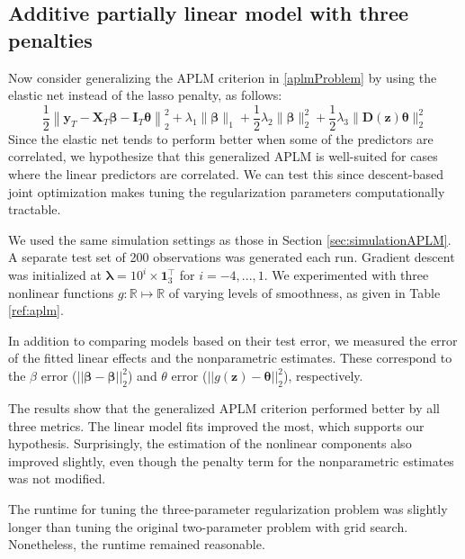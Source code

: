 \documentclass[12pt,letterpaper]{article}
\begin{document}
\subsection{Additive partially linear model with three penalties}
Now consider generalizing the APLM criterion in \eqref{aplmProblem} by using the elastic net instead of the lasso penalty, as follows:
\begin{equation}
\frac{1}{2} \left \|
\boldsymbol{y}_T
- \boldsymbol{X}_T\boldsymbol{\beta}
- \boldsymbol{I}_T \boldsymbol{\theta} \right \|^2_2
+ \lambda_1 \| \boldsymbol \beta \|_1
+ \frac{1}{2} \lambda_2 \| \boldsymbol \beta \|_2^2
+ \frac{1}{2} \lambda_3 \| \boldsymbol D(\boldsymbol z) \boldsymbol \theta \|_2^2
\end{equation}
Since the elastic net tends to perform better when some of the predictors are correlated, we hypothesize that this generalized APLM is well-suited for cases where the linear predictors are correlated. We can test this since descent-based joint optimization makes tuning the regularization parameters computationally tractable.

We used the same simulation settings as those in Section \ref{sec:simulationAPLM}. A separate test set of 200 observations was generated each run. Gradient descent was initialized at $\boldsymbol{\lambda} = 10^i \times \boldsymbol 1_3^\top$ for $i=-4, ..., 1$. We experimented with three nonlinear functions $g:\mathbb{R} \mapsto \mathbb{R}$ of varying levels of smoothness, as given in Table \ref{ref:aplm}.

In addition to comparing models based on their test error, we measured the error of the fitted linear effects and the nonparametric estimates. These correspond to the $\beta$ error ($||\boldsymbol \beta - \hat {\boldsymbol \beta}||_2^2$) and $\theta$ error ($|| g(\boldsymbol z) - \boldsymbol \theta ||_2^2$), respectively.

The results show that the generalized APLM criterion performed better by all three metrics. The linear model fits improved the most, which supports our hypothesis. Surprisingly, the estimation of the nonlinear components also improved slightly, even though the penalty term for the nonparametric estimates was not modified.

The runtime for tuning the three-parameter regularization problem was slightly longer than tuning the original two-parameter problem with grid search. Nonetheless, the runtime remained reasonable.
\end{document}

